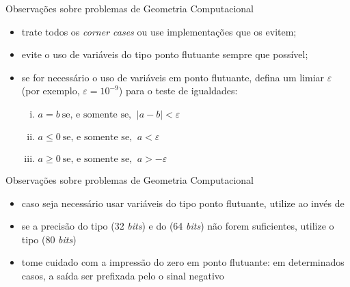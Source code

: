 \begin{frame}[fragile]{Observações sobre problemas de Geometria Computacional}

    \begin{itemize}
        \item trate todos os \textit{corner cases} ou use implementações que os evitem;
        \pause

        \item evite o uso de variáveis do tipo ponto flutuante sempre que possível;
        \pause

        \item se for necessário o uso de variáveis em ponto flutuante, defina um limiar $\varepsilon$ 
        (por exemplo, $\varepsilon = 10^{-9}$) para o teste de igualdades:
        \pause

        \begin{enumerate}[i.]
            \item $a = b \ \mbox{se, e somente se, }\ |a - b| < \varepsilon$
        \pause
            \item $a \leq 0 \ \mbox{se, e somente se, }\ a < \varepsilon$
        \pause
            \item $a \geq 0 \ \mbox{se, e somente se, }\ a > -\varepsilon$
        \end{enumerate}
        \pause


    \end{itemize}

\end{frame}

\begin{frame}[fragile]{Observações sobre problemas de Geometria Computacional}

    \begin{itemize}
        \item caso seja necessário usar variáveis do tipo ponto flutuante, utilize 
             ao invés de 
        \pause

        \item se a precisão do tipo  (32 \textit{bits}) e do  
        (64 \textit{bits}) não forem suficientes, utilize o tipo 
        (80 \textit{bits})
        \pause

        \item tome cuidado com a impressão do zero em ponto flutuante: em determinados casos, 
        a saída ser prefixada pelo o sinal negativo
        \pause

    \end{itemize}

\end{frame}

